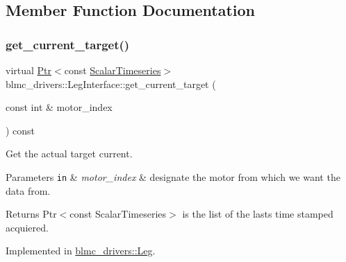 \subsection{Member Function Documentation}
\mbox{\label{classblmc__drivers_1_1LegInterface_a44bac5c9a6015f0e08370b3bc9957512}} 
\subsubsection{\texorpdfstring{get\+\_\+current\+\_\+target()}{get\_current\_target()}}
{\footnotesize\ttfamily virtual \hyperlink{classblmc__drivers_1_1LegInterface_ac5af9e6514abff5ee918813925a8e42d}{Ptr}$<$const \hyperlink{classblmc__drivers_1_1LegInterface_a57a35b64a76fb4225637828d1b1c35a6}{Scalar\+Timeseries}$>$ blmc\+\_\+drivers\+::\+Leg\+Interface\+::get\+\_\+current\+\_\+target (\begin{DoxyParamCaption}\item[{const int \&}]{motor\+\_\+index }\end{DoxyParamCaption}) const\hspace{0.3cm}{\ttfamily [pure virtual]}}



Get the actual target current. 


\begin{DoxyParams}[1]{Parameters}
\mbox{\tt in}  & {\em motor\+\_\+index} & designate the motor from which we want the data from. \\
\hline
\end{DoxyParams}
\begin{DoxyReturn}{Returns}
Ptr$<$const Scalar\+Timeseries$>$ is the list of the lasts time stamped acquiered. 
\end{DoxyReturn}


Implemented in \hyperlink{classblmc__drivers_1_1Leg_aeeb8a84e6dd1f1809d220ee1da8d3007}{blmc\+\_\+drivers\+::\+Leg}.

\mbox{\label{classblmc__drivers_1_1LegInterface_ae653c7ee0ab7aa9d16a6bfce01580200}} 
